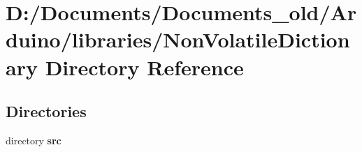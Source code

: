 \section{D\+:/\+Documents/\+Documents\+\_\+old/\+Arduino/libraries/\+Non\+Volatile\+Dictionary Directory Reference}
\label{dir_e714aedcfd0bb3570e589baacd3a52c4}
\subsection*{Directories}
\begin{DoxyCompactItemize}
\item 
directory \textbf{ src}
\end{DoxyCompactItemize}
